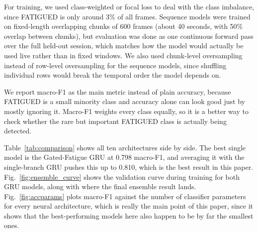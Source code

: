\documentclass[conference]{IEEEtran}
\begin{document}
For training, we used class-weighted or focal loss to deal with the class imbalance, since FATIGUED is only around 3\% of all frames. Sequence models were trained on fixed-length overlapping chunks of 600 frames (about 40 seconds, with 50\% overlap between chunks), but evaluation was done as one continuous forward pass over the full held-out session, which matches how the model would actually be used live rather than in fixed windows. We also used chunk-level oversampling instead of row-level oversampling for the sequence models, since shuffling individual rows would break the temporal order the model depends on.

We report macro-F1 as the main metric instead of plain accuracy, because FATIGUED is a small minority class and accuracy alone can look good just by mostly ignoring it. Macro-F1 weights every class equally, so it is a better way to check whether the rare but important FATIGUED class is actually being detected.

Table~\ref{tab:comparison} shows all ten architectures side by side. The best single model is the Gated-Fatigue GRU at 0.798 macro-F1, and averaging it with the single-branch GRU pushes this up to 0.810, which is the best result in this paper. Fig.~\ref{fig:ensemble_curve} shows the validation curve during training for both GRU models, along with where the final ensemble result lands. Fig.~\ref{fig:accparams} plots macro-F1 against the number of classifier parameters for every neural architecture, which is really the main point of this paper, since it shows that the best-performing models here also happen to be by far the smallest ones.
\end{document}
